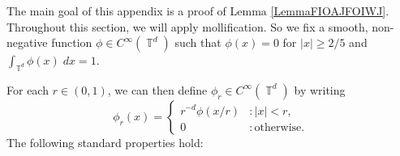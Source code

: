 \documentclass[dvipsnames,letterpaper,12pt]{article}
\numberwithin{equation}{section}
\DeclareMathOperator{\TT}{\mathbb{T}}
\newtheorem{theorem}{Theorem}
\numberwithin{theorem}{section}
\begin{document}
The main goal of this appendix is a proof of Lemma \ref{LemmaFIOAJFOIWJ}. Throughout this section, we will apply mollification. So we fix a smooth, non-negative function $\phi \in C^\infty(\TT^d)$ such that $\phi(x) = 0$ for $|x| \geq 2/5$ and $\int_{\TT^d} \phi(x)\; dx = 1$.
%
\begin{comment}
\begin{theorem} \label{equationASFGCISIX}
    There exists a smooth probability density $\phi \in C^\infty(\TT^d)$ such that $\phi(x) = 0$ for $|x| \geq 2/5$, and such that for each $x \in \TT^d$
    \[ \sum_{k \in \{ 0, 1 \}^d} \phi(x + k/2) = 2^d. \]
\end{theorem}
\begin{proof}
    Let $\psi$ be a non-negative smooth function on $\TT$ such that $\psi(x) = \psi(- x)$ for all $x \in \TT$, $\psi(x) = 1$ for $|x| \leq 1/10$, $\psi(x) = 0$ for $|x| \geq 2/10$, and $0 \leq \psi(x) \leq 1$ for all $x \in \TT$. Then define $\eta$ to be the non-negative, $C^\infty$ function
    \[ \eta(x) = \frac{1}{2} - \frac{\psi(x) + \psi(x + 1/2)}{2}. \]
    If we define
    \[ \phi_0(x) = 2(\psi(x) + \eta(x)), \]
    then $\phi_0(x) + \phi_0(x + 1/2) = 2$ for all $x \in \TT$. Moreover, if $|x| \geq 2/5$, then $\psi(x) = 0$, and since this implies $|x + 1/2| \leq 1/10$, we find $\eta(x) = 0$. Thus $\phi_0(x) = 0$ for $|x| \geq 2/5$. But the condition $\phi_0(x) + \phi_0(x + 1/2) = 2$ implies that $\phi_0$ is a probability density function. Thus it suffices to define
    \[ \phi(x_1, \dots, x_d) = \phi_0(x_1) \dots \phi_0(x_d). \qedhere \]
\end{proof}
\end{comment}
%
For each $r \in (0,1)$, we can then define $\phi_r \in C^\infty(\TT^d)$ by writing
%
\[ \phi_r(x) = \begin{cases} r^{-d} \phi(x/r) &: |x| < r, \\ 0 &: \text{otherwise}. \end{cases} \]
%
The following standard properties hold:
%
\end{document}
